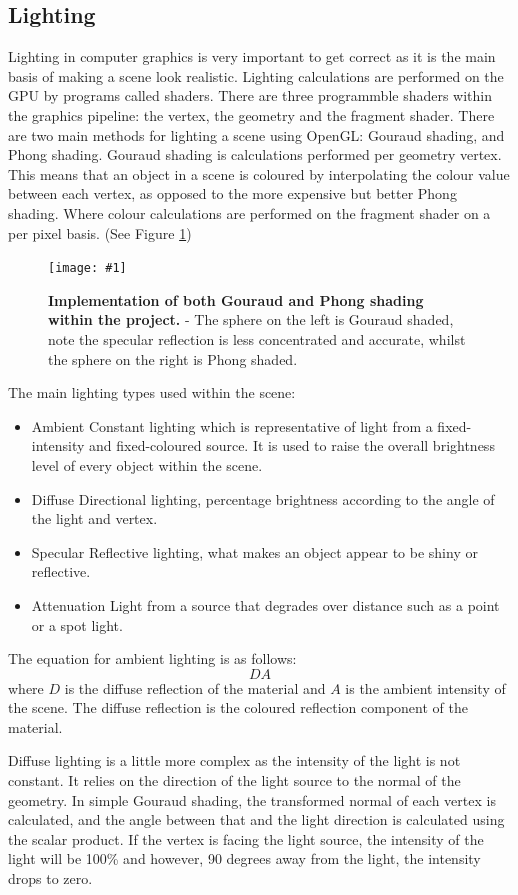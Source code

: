 \documentclass[conference]{acmsiggraph}
\newcommand{\figuremacroW}[4]{
	\begin{figure}[h] %
		\centering
		\texttt{[image: \#1]}
		\caption[#2]{\textbf{#2} - #3}
		\label{fig:#1}
	\end{figure}
}
\begin{document}
\subsection{Lighting}
Lighting in computer graphics is very important to get correct as it is the main basis of making a scene look realistic. Lighting calculations are performed on the GPU by programs called shaders. There are three programmble shaders within the graphics pipeline: the vertex, the geometry and the fragment shader.
    There are two main methods for lighting a scene using OpenGL: Gouraud shading, and Phong shading.
Gouraud shading is %
calculations performed per geometry vertex. This means that an object in a scene is coloured by interpolating the colour value between each vertex, as opposed to the more expensive but better Phong shading. Where colour calculations are performed on the fragment shader on a per pixel basis. (See Figure \ref{fig:gouraudPhong})

\figuremacroW
{gouraudPhong}
{Implementation of both Gouraud and Phong shading within the project. }
{The sphere on the left is Gouraud shaded, note the specular reflection is less concentrated and accurate, whilst the sphere on the right is Phong shaded.}
{1.0}

The main lighting types used within the scene:
\begin{itemize}
    \item {Ambient} Constant lighting which is representative of light from a fixed-intensity and fixed-coloured source. It is used to raise the overall brightness level of every object within the scene. 
    \item {Diffuse} Directional lighting, percentage brightness according to the angle of the light and vertex.
    \item {Specular} Reflective lighting, what makes an object appear to be shiny or reflective.
    \item {Attenuation} Light from a source that degrades over distance such as a point or a spot light.
\end{itemize}

The equation for ambient lighting is as follows:
\begin{equation} \label{ambientLightingEq}
    DA
\end{equation}
where $D$ is the diffuse reflection of the material and $A$ is the ambient intensity of the scene. The diffuse reflection is the coloured reflection component of the material.

Diffuse lighting is a little more complex as the intensity of the light is not constant. It relies on the direction of the light source to the normal of the geometry. In simple Gouraud shading, the transformed normal of each vertex is calculated, and the angle between that and the light direction is calculated using the scalar product. If the vertex is facing the light source, the intensity of the light will be 100\% and however, 90 degrees away from the light, the intensity drops to zero.
\end{document}
